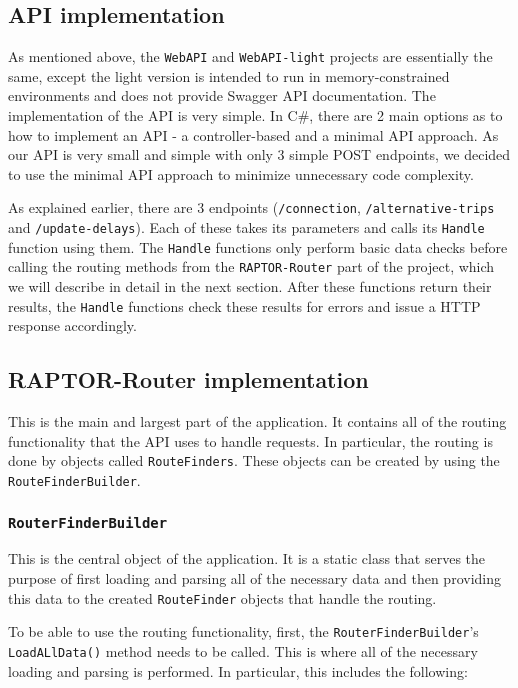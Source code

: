 \subsection{API implementation}

As mentioned above, the \texttt{WebAPI} and \texttt{WebAPI-light} projects are essentially the same, except the light version is intended to run in memory-constrained environments and does not provide Swagger API documentation. The implementation of the API is very simple. In C\#, there are 2 main options as to how to implement an API - a controller-based and a minimal API approach. As our API is very small and simple with only 3 simple POST endpoints, we decided to use the minimal API approach to minimize unnecessary code complexity.

As explained earlier, there are 3 endpoints (\texttt{/connection}, \texttt{/alternative-trips} and \texttt{/update-delays}). Each of these takes its parameters and calls its \texttt{Handle} function using them. The \texttt{Handle} functions only perform basic data checks before calling the routing methods from the \texttt{RAPTOR-Router} part of the project, which we will describe in detail in the next section. After these functions return their results, the \texttt{Handle} functions check these results for errors and issue a HTTP response accordingly.

\subsection{RAPTOR-Router implementation}

This is the main and largest part of the application. It contains all of the routing functionality that the API uses to handle requests. In particular, the routing is done by objects called \texttt{RouteFinders}. These objects can be created by using the \texttt{RouteFinderBuilder}.

\subsubsection{\texttt{RouterFinderBuilder}}

This is the central object of the application. It is a static class that serves the purpose of first loading and parsing all of the necessary data and then providing this data to the created \texttt{RouteFinder} objects that handle the routing.

To be able to use the routing functionality, first, the \texttt{RouterFinderBuilder}'s \texttt{LoadALlData()} method needs to be called. This is where all of the necessary loading and parsing is performed. In particular, this includes the following:


